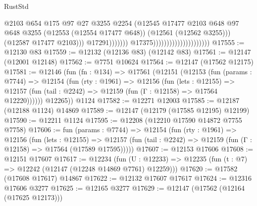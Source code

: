 \begin{lexlean}{RustStd}
\begin{coremodule}
                                                                @2103
                                                                @654
                                                                @175
                                                                @97
                                                                @27
                                                                @3255
                                                                @2254
                                                                (@12545
                                                                  @17477
                                                                  @2103
                                                                  @648
                                                                  @97
                                                                  @648
                                                                  @3255
                                                                  (@12553 (@12554 @17477 @648))
                                                                  (@12561 (@12562 @3255)))
                                                                (@12587 @17477 @2103)))
                                                            @17291)))))))
                                              @17375)))))))))))))))))))))
@17555 := @12130 @83
@17559 := @12132 (@12136 @83) (@12142 @83)
@17561 := @12147 (@12001 @12148)
@17562 := @7751 @10624
@17564 := @12147 (@17562 @12175)
@17581 := @12146
    (fun (fn : @134) =>
    @17561
      (@12151
        (@12153
          (fun (params : @7744) =>
          @12154
            (fun (rty : @1961) =>
            @12156
              (fun (lets : @12155) =>
              @12157 (fun (tail : @2242) => @12159 (fun (Γ : @12158) => @17564 @12220))))))
        @12265))
    @1124
@17582 := @12271 @12003
@17585 := @12187 (@12188 @1124) @14869
@17589 := @12147 (@12179 (@17585 @12195) @12199)
@17590 := @12211 @1124
@17595 := @12208 (@12210 @17590 @14872 @7755 @7758)
@17606 := fun (params : @7744) =>
  @12154
    (fun (rty : @1961) =>
    @12156
      (fun (lets : @12155) =>
      @12157 (fun (tail : @2242) => @12159 (fun (Γ : @12158) => @17564 (@17589 @17595)))))
@17607 := @12153 @17606
@17608 := @12151 @17607
@17617 := @12234
    (fun (U : @12233) => @12235 (fun (t : @7) => @12242 (@12147 (@12248 @14869 @7761) @12259)))
@17620 := @17582 (@17608 @17617) @14867
@17622 := @12132 @17607 @17617
@17624 := @12316 @17606 @3277
@17625 := @12165 @3277
@17629 := @12147 (@17562 (@12164 (@17625 @12173)))

\end{coremodule}
\end{lexlean}
